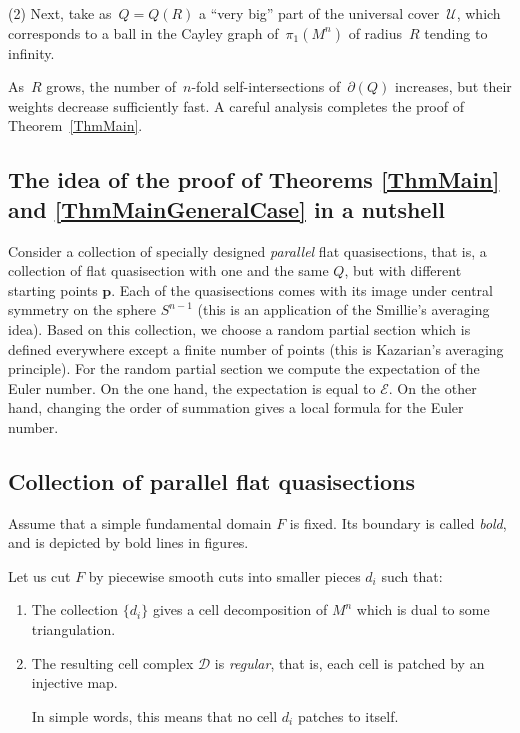 \documentclass[12pt]{amsart}
\theoremstyle{plain}
\theoremstyle{definition}
\theoremstyle{plain}
\theoremstyle{definition}
\begin{document}
  (2) Next,  take as~$Q=Q(R)$ a ``very big'' part of the universal cover~$\mathcal{U}$, which corresponds to a ball in the Cayley graph of~$\pi_1(M^n)$ of radius~$R$
  tending to infinity.
  
  As~$R$ grows, the  number of~$n$-fold self-intersections of~$\partial(Q)$ increases, but their weights decrease sufficiently fast. A careful analysis completes the proof of Theorem~\ref{ThmMain}.
  
  
  \bigskip

\fi

\subsection{The idea of the proof of Theorems \ref{ThmMain} and \ref{ThmMainGeneralCase} in a nutshell}
 Consider a collection of specially designed \textit{parallel} flat  quasisections, that is, a collection of flat quasisection with one and the same $Q$, but with different starting points $\textbf{p}$. Each of the quasisections  comes with its image under central symmetry on the sphere $S^{n-1}$ (this is an application of the Smillie's averaging idea). Based on this collection, we choose a random partial section which is defined everywhere except a finite number of points (this is Kazarian's averaging principle). For the random partial section we compute the expectation of the Euler number. On the one hand, the expectation is equal to $\mathcal{E}$. On the other hand, changing the order of summation gives a local formula for the Euler number.
    
    
    \subsection{Collection of parallel flat quasisections}\label{secEssent}
    
 Assume that a simple fundamental domain $F$ is fixed. Its boundary  {is} called \textit{bold},   and  {is} depicted by bold lines in figures.
 
 Let us cut $F$ by piecewise smooth cuts into smaller pieces $d_i$ such that:
 
 \begin{enumerate}
   \item The collection $\{d_i\}$ gives a cell decomposition of $M^n$ which is dual to some triangulation.
   \item The resulting cell complex $\mathcal{D}$  is \textit{regular}, that is, each cell is patched by an injective map.
   
   In simple words, this means that no cell $d_i$ patches to itself.
 \end{enumerate}
 
\end{document}

